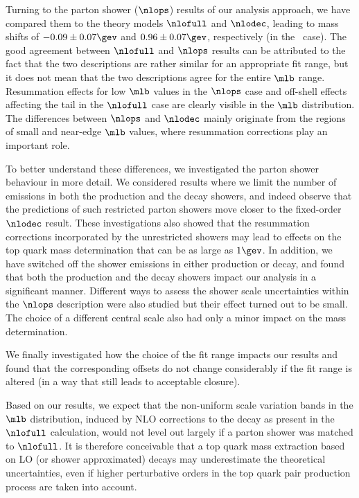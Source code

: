 Turning to the parton shower ($\nlops$) results of our analysis
approach, we have compared them to the theory models $\nlofull$ and
$\nlodec$, leading to mass shifts of $-0.09\pm0.07\gev$ and
$0.96\pm0.07\gev$, respectively (in the \mlb\ case).
%
The good agreement between $\nlofull$ and $\nlops$ results can be
attributed to the fact that the two descriptions are rather similar
for an appropriate fit range, but it does not mean that the two descriptions
agree for the entire $\mlb$ range. Resummation effects for low $\mlb$ values
in the $\nlops$ case and off-shell effects affecting the tail in the
$\nlofull$ case are clearly visible in the $\mlb$ distribution.
The differences between $\nlops$ and $\nlodec$ mainly originate from
the regions of small and near-edge $\mlb$ values, where resummation
corrections play an important role.

To better understand these differences, we investigated the parton shower
behaviour in more detail.
%
We considered results where we limit the number of emissions in both the
production and the decay showers, and indeed observe that the predictions of
such restricted parton showers move closer to the fixed-order $\nlodec$ result.
%
These investigations also showed that the resummation corrections incorporated
by the unrestricted showers may lead to effects on the top quark mass
determination that can be as large as $1\gev$.
%
In addition, we have switched off the shower emissions in either production or
decay, and found that both the production and the decay showers impact our
analysis in a significant manner.
%
Different ways to assess the shower scale uncertainties within the $\nlops$
description were also studied but their effect turned out to be small. 
%
The choice of a different central scale also had only a minor impact on the mass determination.

We finally investigated how the choice of the fit range impacts our
results and found that the corresponding offsets do not change considerably
if the fit range is altered (in a way that still leads to acceptable closure).

Based on our results, we expect that the non-uniform scale variation bands
in the $\mlb$ distribution, induced by NLO corrections to the decay as present
in the $\nlofull$ calculation, would not level out largely if a parton
shower was matched to $\nlofull$.
%
It is therefore conceivable that a top quark mass extraction based on LO
(or shower approximated) decays may underestimate the theoretical
uncertainties, even if higher perturbative orders in the top quark pair
production process are taken into account.

